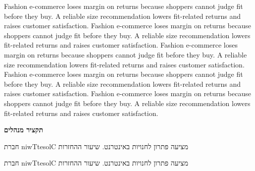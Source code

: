 \documentclass[a4paper,11pt]{article}
\begin{document}
Fashion e-commerce loses margin on returns because shoppers cannot judge fit before they buy. A reliable size recommendation lowers fit-related returns and raises customer satisfaction. Fashion e-commerce loses margin on returns because shoppers cannot judge fit before they buy. A reliable size recommendation lowers fit-related returns and raises customer satisfaction. Fashion e-commerce loses margin on returns because shoppers cannot judge fit before they buy. A reliable size recommendation lowers fit-related returns and raises customer satisfaction. Fashion e-commerce loses margin on returns because shoppers cannot judge fit before they buy. A reliable size recommendation lowers fit-related returns and raises customer satisfaction. Fashion e-commerce loses margin on returns because shoppers cannot judge fit before they buy. A reliable size recommendation lowers fit-related returns and raises customer satisfaction. 
\newpage
\begin{otherlanguage}{hebrew}
{\headfont\bfseries\Large תקציר מנהלים}\par
חברת niwTtesolC מציעה פתרון לחנויות באינטרנט. שיעור ההחזרות %
\end{otherlanguage}
\newpage
\begin{otherlanguage}{hebrew}
חברת niwTtesolC מציעה פתרון לחנויות באינטרנט. שיעור ההחזרות %
\end{otherlanguage}
\end{document}
